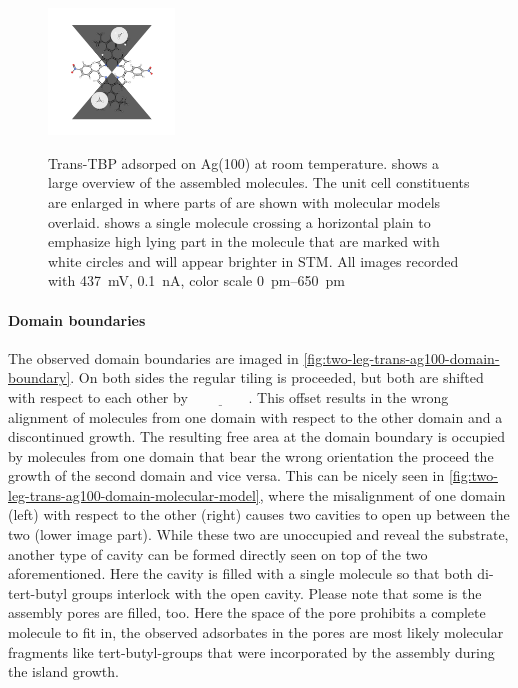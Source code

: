 \begin{figure}[]
{		\includegraphics[width=0.3\textwidth]{./images/F160429-185245-R-single-molecule}
		\label{fig:two-leg-trans-ag100-single-molecule}
	} %
	\caption{Trans-TBP adsorped on Ag(100) at room temperature.  shows a large overview of the assembled molecules. The unit cell constituents are enlarged in  where parts of  are shown with molecular models overlaid.  shows a single molecule crossing a horizontal plain to emphasize high lying part in the molecule that are marked with white circles and will appear brighter in STM. All images recorded with \SI{437}{\milli\volt}, \SI{0.1}{\nano\ampere}, color scale \SIrange{0}{650}{\pico\meter}
	}
	\label{fig:two-leg-trans-ag100-motif}
\end{figure}

\paragraph{Domain boundaries}
The observed domain boundaries are imaged in \autoref{fig:two-leg-trans-ag100-domain-boundary}. On both sides the regular tiling is proceeded, but both are shifted with respect to each other by $\underline{\qquad \qquad}$. This offset results in the wrong alignment of molecules from one  domain with respect to the other domain and a discontinued growth. The resulting free area at the domain boundary is occupied by molecules from one domain that bear the wrong orientation the proceed the growth of the second domain and vice versa. This can be nicely seen in 		\autoref{fig:two-leg-trans-ag100-domain-molecular-model}, where the misalignment of one domain (left) with respect to the other (right) causes two cavities to open up between the two (lower image part). While these two are unoccupied and reveal the substrate, another type of cavity can be formed directly seen on top of the two aforementioned. Here the cavity is filled with a single molecule so that both di-tert-butyl groups interlock with the open cavity. Please note that some is the assembly pores are filled, too. Here the space of the pore prohibits a complete molecule to fit in, the observed adsorbates in the pores are most likely molecular fragments like tert-butyl-groups that were incorporated by the assembly during the island growth.

